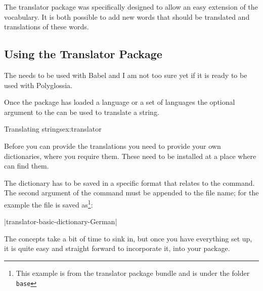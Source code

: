 The translator package was specifically designed to allow an easy
extension of the vocabulary. It is both possible to add new words that
should be translated and translations of these words.

\subsection{Using the Translator Package}

  The  needs to be used with Babel and I am not too sure yet 
  if it is ready  to be used with Polyglossia.

Once the package has loaded a language or a set of languages the optional argument to the
\cmd{\translate} can be used to translate a string. 

\begin{texexample}{Translating strings}{ex:translator}
\end{texexample}

Before you can provide the translations you need to provide your own dictionaries, where you require them. These need to be installed at a place where \tex can find them.

\CMDI{\ProvidesDictionary}

The dictionary has to be saved in a specific format that relates to the \cmd{\ProvidesDictionary} command. The second argument of the command must be appended to the file name; for the example the file is saved as\footnote{This  example is from the translator package bundle and is under the folder \texttt{base}}:

|translator-basic-dictionary-German|

The concepts take a bit of time to sink in, but once you have everything set up, it is quite easy and straight forward to incorporate it, into your package. 

\begin{teXXX}

\end{teXXX} 

